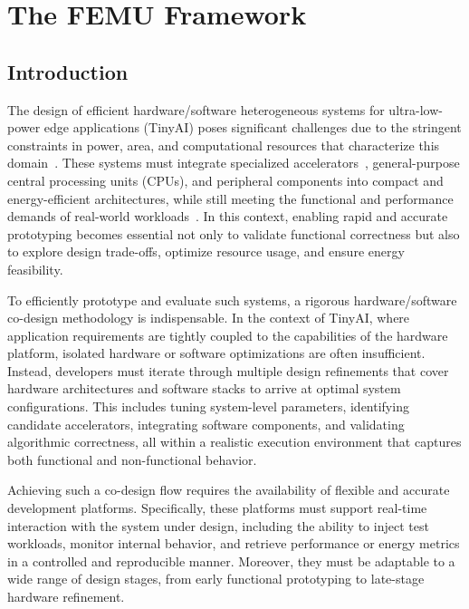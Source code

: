 \chapter{The FEMU Framework}

    \section{Introduction}
    \label{sec:introduction}

        The design of efficient hardware/software heterogeneous systems for ultra-low-power edge applications (TinyAI) poses significant challenges due to the stringent constraints in power, area, and computational resources that characterize this domain~\cite{co-design_vision}. These systems must integrate specialized accelerators~\cite{e-gpu, asip, oe-cgra, blade}, general-purpose central processing units (CPUs), and peripheral components into compact and energy-efficient architectures, while still meeting the functional and performance demands of real-world workloads~\cite{bio_apps}. In this context, enabling rapid and accurate prototyping becomes essential not only to validate functional correctness but also to explore design trade-offs, optimize resource usage, and ensure energy feasibility.

        To efficiently prototype and evaluate such systems, a rigorous hardware/software co-design methodology is indispensable. In the context of TinyAI, where application requirements are tightly coupled to the capabilities of the hardware platform, isolated hardware or software optimizations are often insufficient. Instead, developers must iterate through multiple design refinements that cover hardware architectures and software stacks to arrive at optimal system configurations. This includes tuning system-level parameters, identifying candidate accelerators, integrating software components, and validating algorithmic correctness, all within a realistic execution environment that captures both functional and non-functional behavior.
        
        Achieving such a co-design flow requires the availability of flexible and accurate development platforms. Specifically, these platforms must support real-time interaction with the system under design, including the ability to inject test workloads, monitor internal behavior, and retrieve performance or energy metrics in a controlled and reproducible manner. Moreover, they must be adaptable to a wide range of design stages, from early functional prototyping to late-stage hardware refinement.

